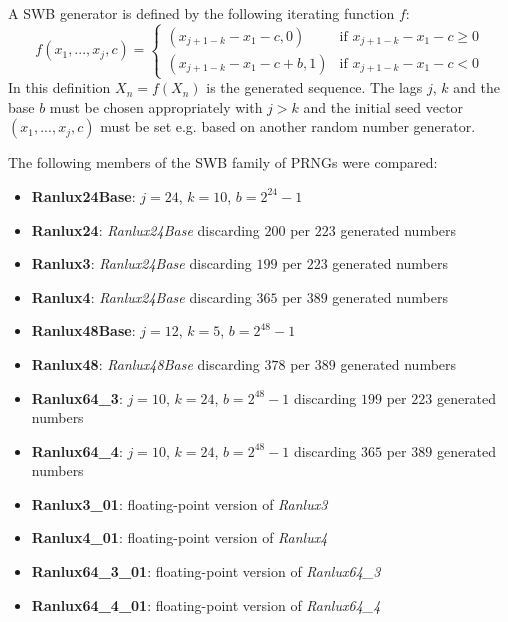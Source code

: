     A SWB generator is defined by the following iterating function $f$:
    \begin{equation*}
        f\left(x_1, ..., x_j, c\right) = \begin{cases}
                                             \left(x_{j + 1 - k} - x_1 - c, 0\right)     & \text{if } x_{j + 1 - k} - x_1 - c \geq 0 \\
                                             \left(x_{j + 1 - k} - x_1 - c + b, 1\right) & \text{if } x_{j + 1 - k} - x_1 - c < 0
                                         \end{cases}
    \end{equation*}
    In this definition $X_n = f\left(X_n\right)$ is the generated sequence. The lags $j$, $k$ and the base $b$ must be chosen appropriately with $j > k$ and the initial seed vector $\left(x_1, ..., x_j, c\right)$ must be set e.g. based on another random number generator.

    The following members of the SWB family of PRNGs were compared:
    \begin{itemize}
        \itemsep0em
        \item \textbf{Ranlux24Base}:    $j = 24$, $k = 10$, $b = 2^{24} - 1$
        \item \textbf{Ranlux24}:        \textit{Ranlux24Base} discarding $200$ per $223$ generated numbers
        \item \textbf{Ranlux3}:         \textit{Ranlux24Base} discarding $199$ per $223$ generated numbers
        \item \textbf{Ranlux4}:         \textit{Ranlux24Base} discarding $365$ per $389$ generated numbers
        \item \textbf{Ranlux48Base}:    $j = 12$, $k = 5$, $b = 2^{48} - 1$
        \item \textbf{Ranlux48}:        \textit{Ranlux48Base} discarding $378$ per $389$ generated numbers
        \item \textbf{Ranlux64\_3}:     $j = 10$, $k = 24$, $b = 2^{48} - 1$ discarding $199$ per $223$ generated numbers
        \item \textbf{Ranlux64\_4}:     $j = 10$, $k = 24$, $b = 2^{48} - 1$ discarding $365$ per $389$ generated numbers
        \item \textbf{Ranlux3\_01}:     floating-point version of \textit{Ranlux3}
        \item \textbf{Ranlux4\_01}:     floating-point version of \textit{Ranlux4}
        \item \textbf{Ranlux64\_3\_01}: floating-point version of \textit{Ranlux64\_3}
        \item \textbf{Ranlux64\_4\_01}: floating-point version of \textit{Ranlux64\_4}
    \end{itemize}


